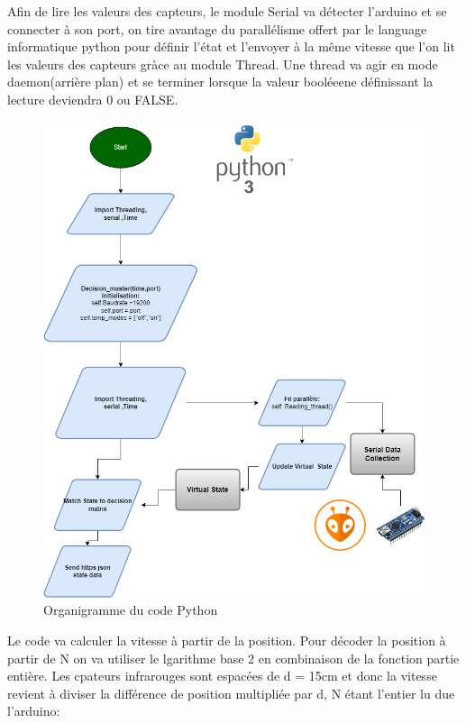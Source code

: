 \documentclass[journal]{IEEEtran}
\begin{document}
Afin de lire les valeurs des capteurs, le module Serial va détecter l'arduino et se connecter à son port, on tire avantage du parallélisme offert par le language informatique python pour 
définir l'état et l'envoyer à la même vitesse que l'on lit les valeurs des capteurs gràce au module Thread. Une thread va agir en mode daemon(arrière plan) et se terminer lorsque la valeur booléeene définissant
la lecture deviendra 0 ou FALSE.

\begin{figure}[htbp]
    \centerline{\includegraphics[scale = 0.18]{Trottoir_Flowchart.drawio.png}}
    \caption{Organigramme du code Python}
    \label{fig5}
\end{figure} 

Le code va calculer la vitesse  à partir de la position. Pour décoder la position à partir de N on va utiliser le lgarithme base 2 en combinaison de la fonction partie entière. Les cpateurs infrarouges
sont espacées de d = 15cm et donc la vitesse revient à diviser la différence de position multipliée par d, N étant l'entier lu due l'arduino:
\end{document}
